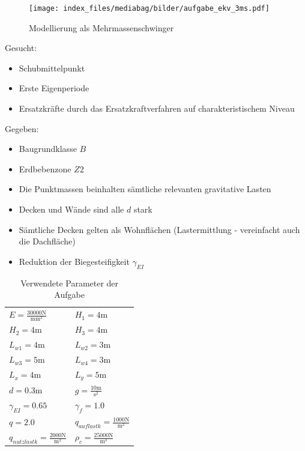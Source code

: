 \documentclass[
  letterpaper,
  DIV=11]{scrreprt}
\providecommand{\tightlist}{%
  \setlength{\itemsep}{0pt}\setlength{\parskip}{0pt}}\usepackage{longtable,booktabs,array}
\begin{document}
\begin{figure}[H]

{\centering \texttt{[image: index\_files/mediabag/bilder/aufgabe\_ekv\_3ms.pdf]}

}

\caption{\label{fig-ekv_modell}Modellierung als Mehrmassenschwinger}

\end{figure}

Gesucht:

\begin{itemize}
\tightlist
\item
  Schubmittelpunkt
\item
  Erste Eigenperiode
\item
  Ersatzkräfte durch das Ersatzkraftverfahren auf charakteristischem
  Niveau
\end{itemize}

Gegeben:

\begin{itemize}
\tightlist
\item
  Baugrundklasse \(B\)
\item
  Erdbebenzone \(Z2\)
\item
  Die Punktmassen beinhalten sämtliche relevanten gravitative Lasten
\item
  Decken und Wände sind alle \(d\) stark
\item
  Sämtliche Decken gelten als Wohnflächen (Lastermittlung - vereinfacht
  auch die Dachfläche)
\item
  Reduktion der Biegesteifigkeit \(\gamma_{EI}\)
\end{itemize}

\hypertarget{tbl-parameter_ekv1}{}
\begin{longtable}[]{@{}
  >{\raggedright\arraybackslash}p{}
  >{\raggedright\arraybackslash}p{}@{}}
\caption{\label{tbl-parameter_ekv1}Verwendete Parameter der
Aufgabe}\tabularnewline
\toprule\noalign{}
\endfirsthead
\endhead
\bottomrule\noalign{}
\endlastfoot
\(E = \frac{30000 \text{N}}{\text{mm}^{2}}\) & \(H_{1} = 4 \text{m}\) \\
\(H_{2} = 4 \text{m}\) & \(H_{3} = 4 \text{m}\) \\
\(L_{w1} = 4 \text{m}\) & \(L_{w2} = 3 \text{m}\) \\
\(L_{w3} = 5 \text{m}\) & \(L_{w4} = 3 \text{m}\) \\
\(L_{x} = 4 \text{m}\) & \(L_{y} = 5 \text{m}\) \\
\(d = 0.3 \text{m}\) & \(g = \frac{10 \text{m}}{\text{s}^{2}}\) \\
\(\gamma_{EI} = 0.65\) & \(\gamma_{f} = 1.0\) \\
\(q = 2.0\) & \(q_{auflast k} = \frac{1000 \text{N}}{\text{m}^{2}}\) \\
\(q_{nutzlast k} = \frac{2000 \text{N}}{\text{m}^{2}}\) &
\(\rho_{c} = \frac{25000 \text{N}}{\text{m}^{3}}\) \\
\end{longtable}
\end{document}
